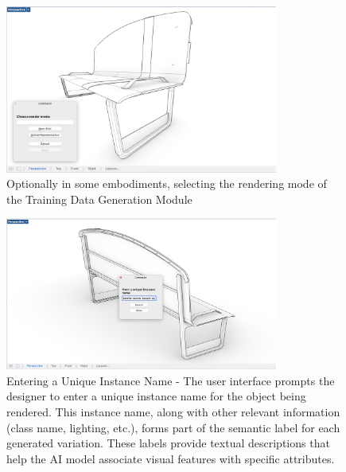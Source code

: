 \documentclass[12pt]{article}
\begin{document}
\begin{figure}[h]
    \centering
    \includegraphics[width=0.8\textwidth]{figures/figure-process-choose-render-mode-monochrome.jpg} 
    \caption{Optionally in some embodiments, selecting the rendering mode of the Training Data Generation Module}
    \label{fig:render_mode_selection}
\end{figure}

\begin{figure}[h]
    \centering
    \includegraphics[width=0.8\textwidth]{figures/figure-process-instance-name-barrier-1up-xy-monochrome.jpg}
    \caption{Entering a Unique Instance Name - The user interface prompts the designer to enter a unique instance name for the object being rendered. This instance name, along with other relevant information (class name, lighting, etc.), forms part of the semantic label for each generated variation. These labels provide textual descriptions that help the AI model associate visual features with specific attributes.}
    \label{fig:instance_name_input}
\end{figure}
\end{document}
